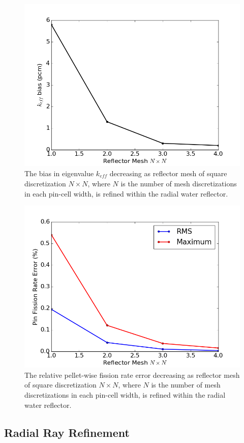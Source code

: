 \begin{figure}[h!]
	\centering
	\includegraphics[width=0.7\linewidth]{figures/results/sensitivity/reflector_mesh_pcm.png}
	\caption[]{The bias in eigenvalue $k_{\textit{eff}}$ decreasing as reflector mesh of square discretization $N \times N$, where $N$ is the number of mesh discretizations in each pin-cell width, is refined within the radial water reflector.}
	\label{fig:rad-ref-pcm}
\end{figure}
\begin{figure}[h!]
	\centering
	\includegraphics[width=0.7\linewidth]{figures/results/sensitivity/reflector_mesh_fr.png}
	\caption[]{The relative pellet-wise fission rate error decreasing as reflector mesh of square discretization $N \times N$, where $N$ is the number of mesh discretizations in each pin-cell width, is refined within the radial water reflector.}
	\label{fig:rad-ref-fr}
\end{figure}

\clearpage
\subsection{Radial Ray Refinement}


